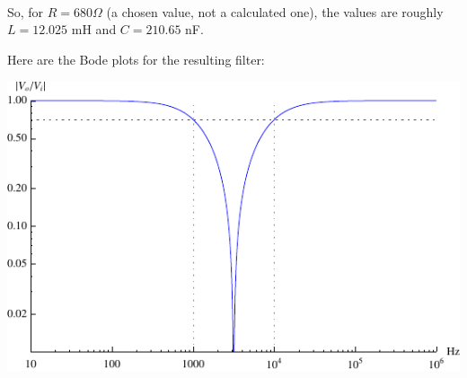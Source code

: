 \documentclass[12pt,a4paper]{report}
\begin{document}

\ \\
So, for $R = 680 \Omega$ (a chosen value, not a calculated one), the values are roughly $L = 12.025$ mH and $C = 210.65$ nF.

Here are the Bode plots for the resulting filter:

\includegraphics[scale=1.4]{Graphics/bsf_magnitude_plot}
\end{document}
